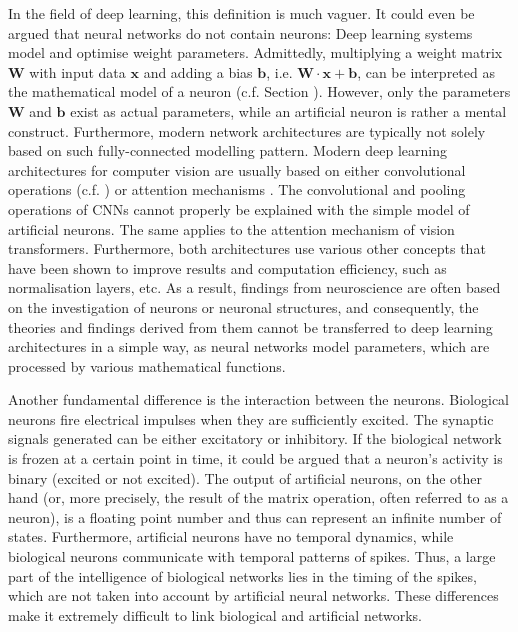 In the field of deep learning, this definition is much vaguer. It could even be argued that neural networks do not contain neurons: Deep learning systems model and optimise weight parameters. Admittedly, multiplying a weight matrix $\boldsymbol{W}$ with input data $\boldsymbol{x}$ and adding a bias $\boldsymbol{b}$, i.e. $\boldsymbol{W} \cdot \boldsymbol{x} + \boldsymbol{b}$, can be interpreted as the mathematical model of a neuron (c.f. Section ).
However, only the parameters $\boldsymbol{W}$ and $\boldsymbol{b}$ exist as actual parameters, while an artificial neuron is rather a mental construct.
Furthermore, modern network architectures are typically not solely based on such fully-connected modelling pattern.
Modern deep learning architectures for computer vision are usually based on either convolutional operations (c.f. ) or attention mechanisms .
The convolutional and pooling operations of CNNs cannot properly be explained with the simple model of artificial neurons.
The same applies to the attention mechanism of vision transformers. Furthermore, both architectures use various other concepts that have been shown to improve results and computation efficiency, such as normalisation layers, etc.
As a result, findings from neuroscience are often based on the investigation of neurons or neuronal structures, and consequently, the theories and findings derived from them cannot be transferred to deep learning architectures in a simple way, as neural networks model parameters, which are processed by various mathematical functions.

Another fundamental difference is the interaction between the neurons. Biological neurons fire electrical impulses when they are sufficiently excited. The synaptic signals generated can be either excitatory or inhibitory. If the biological network is frozen at a certain point in time, it could be argued that a neuron's activity is binary (excited or not excited).
The output of artificial neurons, on the other hand (or, more precisely, the result of the matrix operation, often referred to as a neuron), is a floating point number and thus can represent an infinite number of states. Furthermore, artificial neurons have no temporal dynamics, while biological neurons communicate with temporal patterns of spikes. Thus, a large part of the intelligence of biological networks lies in the timing of the spikes, which are not taken into account by artificial neural networks. These differences make it extremely difficult to link biological and artificial networks.

